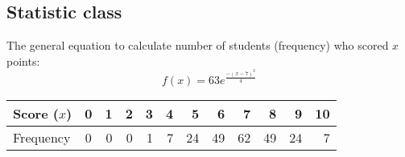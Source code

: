 \documentclass[12pt]{article}
\begin{document}
\vspace{1cm}

\subsection*{Statistic class}
The general equation to calculate number of students (frequency) who scored $x$ points: $$f(x)=63e^{\frac{ -\left(x-7 \right)^2}{4}} $$ \par
\begin{center}
    \begin{tabular}{l | c*{10}r}
        Score ($x$) & 0 & 1 & 2 & 3 & 4 & 5 & 6 & 7 & 8 & 9 & 10 \\
        \hline
        Frequency &0 &0 &0 &1 &7 &24 &49 &62 &49 &24 &7 \\
    \end{tabular}
\end{center}
\end{document}
